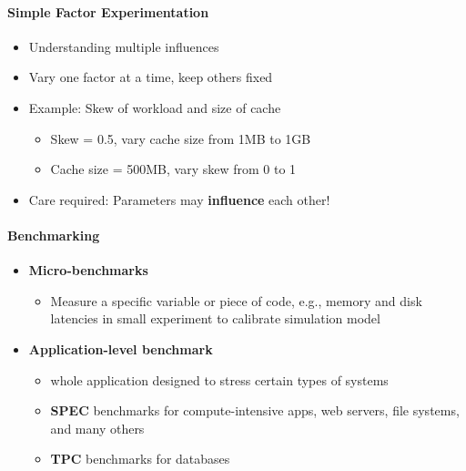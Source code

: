 \paragraph{Simple Factor Experimentation}
\begin{itemize}
\item Understanding multiple influences
\item Vary one factor at a time, keep others fixed

\item Example: Skew of workload and size of cache
  \begin{itemize}
  \item Skew = 0.5, vary cache size from 1MB to 1GB
  \item Cache size = 500MB, vary skew from 0 to 1
  \end{itemize}

\item Care required:
  Parameters may \textbf{influence} each other!
\end{itemize}

\paragraph{Benchmarking}

\begin{itemize}
\item \textbf{Micro-benchmarks}
  \begin{itemize}
  \item Measure a specific variable or piece of code, e.g.,
    memory and disk latencies in small experiment to
    calibrate simulation model
  \end{itemize}

\item \textbf{Application-level benchmark}
  \begin{itemize}
  \item whole application designed to stress certain types of systems
  \item \textbf{SPEC} benchmarks for compute-intensive apps,
    web servers, file systems, and many others
  \item \textbf{TPC} benchmarks for databases
  \end{itemize}
\end{itemize}

